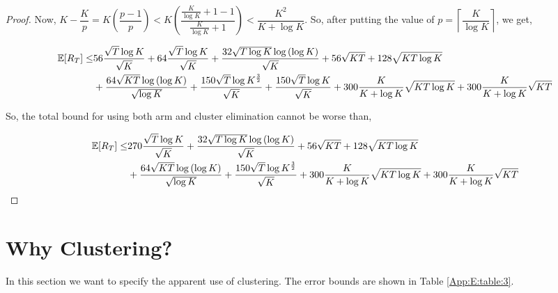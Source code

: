 \begin{proof}
	Now, $K-\dfrac{K}{p}= K\left( \dfrac{p-1}{p} \right) < K\left(  \dfrac{\frac{K}{\log K}+1-1}{\frac{K}{\log K}+1 }\right) < \dfrac{K^2}{K+\log K}$. So, after putting the value of $p=\left\lceil \dfrac{K}{\log K} \right\rceil$, we get,
	
	\begin{align*}
	\mathbb{E}[R_{T}]\leq & 56\dfrac{\sqrt{T}\log K}{\sqrt{K}} + 64\dfrac{\sqrt{T}\log K}{\sqrt{K}} + \dfrac{32\sqrt{T\log K}\log{(\log K)}}{\sqrt{K}} + 56\sqrt{KT} + 128\sqrt{KT\log K}\\
	& + \dfrac{64\sqrt{KT}\log{(\log K)}}{\sqrt{\log K}} + \dfrac{150 \sqrt{T}\log K^{\frac{3}{2}} }{\sqrt{K}} + \dfrac{150 \sqrt{T}\log K}{\sqrt{K}} + 300 \dfrac{K}{K+\log K}\sqrt{KT\log K} + 300 \dfrac{K}{K+\log K}\sqrt{KT}\\ 
	\end{align*}
 	
	So, the total bound for using both arm and cluster elimination cannot be worse than,
	
	\begin{align*}
	\mathbb{E}[R_{T}]\leq & 270\dfrac{\sqrt{T}\log K}{\sqrt{K}} + \dfrac{32\sqrt{T\log K}\log{(\log K)}}{\sqrt{K}} + 56\sqrt{KT} + 128\sqrt{KT\log K}\\
	& + \dfrac{64\sqrt{KT}\log{(\log K)}}{\sqrt{\log K}} + \dfrac{150 \sqrt{T}\log K^{\frac{3}{2}} }{\sqrt{K}} + 300 \dfrac{K}{K+\log K}\sqrt{KT\log K} + 300 \dfrac{K}{K+\log K}\sqrt{KT}\\ 
	\end{align*}		
\end{proof}

\section{Why Clustering?}
\label{App:E}

In this section we want to specify the apparent use of clustering. The error bounds are shown in Table \ref{App:E:table:3}.


 
